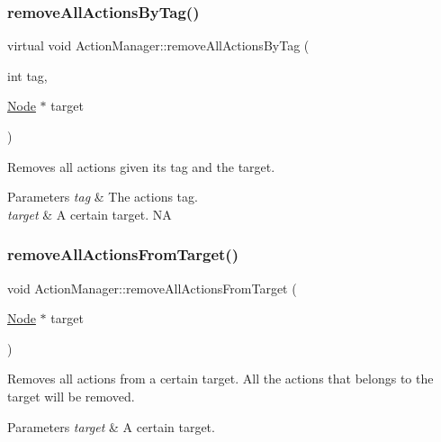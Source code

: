 \subsubsection{\texorpdfstring{remove\+All\+Actions\+By\+Tag()}{removeAllActionsByTag()}\hspace{0.1cm}{\footnotesize\ttfamily [2/2]}}
{\footnotesize\ttfamily virtual void Action\+Manager\+::remove\+All\+Actions\+By\+Tag (\begin{DoxyParamCaption}\item[{int}]{tag,  }\item[{\hyperlink{classNode}{Node} $\ast$}]{target }\end{DoxyParamCaption})\hspace{0.3cm}{\ttfamily [virtual]}}

Removes all actions given its tag and the target.


\begin{DoxyParams}{Parameters}
{\em tag} & The actions\textquotesingle{} tag. \\
\hline
{\em target} & A certain target.  NA \\
\hline
\end{DoxyParams}
\mbox{\label{classActionManager_a09444b573711b9389e460f9a71837299}} 
\subsubsection{\texorpdfstring{remove\+All\+Actions\+From\+Target()}{removeAllActionsFromTarget()}\hspace{0.1cm}{\footnotesize\ttfamily [1/2]}}
{\footnotesize\ttfamily void Action\+Manager\+::remove\+All\+Actions\+From\+Target (\begin{DoxyParamCaption}\item[{\hyperlink{classNode}{Node} $\ast$}]{target }\end{DoxyParamCaption})}

Removes all actions from a certain target. All the actions that belongs to the target will be removed.


\begin{DoxyParams}{Parameters}
{\em target} & A certain target. \\
\hline
\end{DoxyParams}
\mbox{\label{classActionManager_ab258c22774156c41fad6e4526aadaa63}} 
